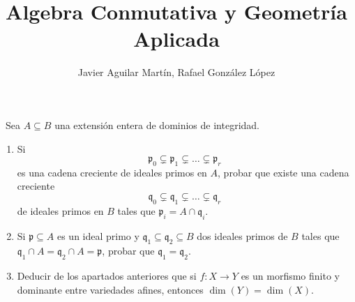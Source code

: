 \documentclass[twoside]{article}
\begin{document}
\title{Algebra Conmutativa y Geometría Aplicada}
\author{Javier Aguilar Martín, Rafael González López}
\maketitle

\begin{ejercicio}{3}\
Sea $A \subseteq B$ una extensión entera de dominios de integridad.
 
\begin{enumerate}
\item\label{1} Si
$$\mathfrak{p}_0 \subsetneq \mathfrak{p}_1 \subsetneq \dots \subsetneq \mathfrak{p}_r$$
es una cadena creciente de ideales primos en $A$, probar que existe una
cadena creciente
$$\mathfrak{q}_0 \subsetneq \mathfrak{q}_1 \subsetneq \dots \subsetneq \mathfrak{q}_r$$
de ideales primos en $B$ tales que $\mathfrak{p}_i = A \cap \mathfrak{q}_i$.
\item\label{2} Si $\mathfrak{p} \subseteq A$ es un ideal primo y $\mathfrak{q}_1 \subseteq \mathfrak{q}_2 \subseteq B$ dos ideales primos de $B$ tales
que $\mathfrak{q}_1 \cap A = \mathfrak{q}_2 \cap A = \mathfrak{p}$, probar que $\mathfrak{q}_1 = \mathfrak{q}_2$.
\item Deducir de los apartados anteriores que si $f : X \to Y$ es un morfismo
finito y dominante entre variedades afines, entonces $\dim(Y ) = \dim(X)$.

\end{enumerate}
\end{ejercicio}
\end{document}
